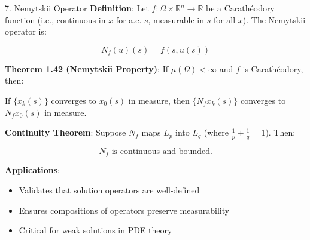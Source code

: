 \documentclass[aspectratio=169,10pt]{beamer}
\begin{document}
\begin{frame}[allowframebreaks]{7. Nemytskii Operator}
    \textbf{Definition}: Let $f: \Omega \times \mathbb{R}^n \to \mathbb{R}$ be a Carathéodory function (i.e., continuous in $x$ for a.e. $s$, measurable in $s$ for all $x$). The Nemytskii operator is:

    $$N_f(u)(s) = f(s, u(s))$$

    \vspace{0.4cm}
    \textbf{Theorem 1.42 (Nemytskii Property)}:
    If $\mu(\Omega) < \infty$ and $f$ is Carathéodory, then:

    If $\{x_k(s)\}$ converges to $x_0(s)$ in measure, then $\{N_f x_k(s)\}$ converges to $N_f x_0(s)$ in measure.

    \vspace{0.4cm}
    \textbf{Continuity Theorem}:
    Suppose $N_f$ maps $L_p$ into $L_q$ (where $\tfrac{1}{p} + \tfrac{1}{q} = 1$). Then:

    $$N_f \text{ is continuous and bounded.}$$

    \vspace{0.4cm}
    \textbf{Applications}:
    \begin{itemize}
        \item Validates that solution operators are well-defined
        \item Ensures compositions of operators preserve measurability
        \item Critical for weak solutions in PDE theory
    \end{itemize}
\end{frame}
\end{document}
